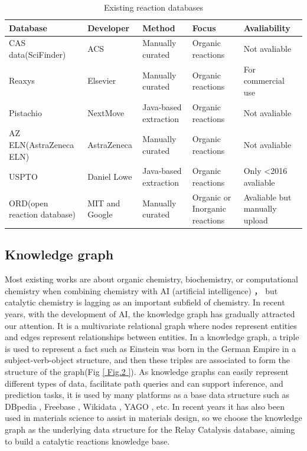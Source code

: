 \documentclass[%
 aip,
 jmp,%
 amsmath,amssymb,
 reprint,%
]{revtex4-2}
\begin{document}
\begin{table}[h!]
\begin{tabular}{ |p{3cm}|p{3cm}|p{3cm}|p{3cm}|p{3cm}|  }
\hline
Database&Developer&Method&Focus&Avaliability\\ \hline
CAS data(SciFinder)& ACS    &Manually curated&   Organic reactions&Not avaliable\\ \hline
Reaxys&   Elsevier  & Manually curated   &Organic reactions&For commercial use\\ \hline
Pistachio & NextMove & Java-based extraction &  Organic reactions&Not avaliable\\ \hline
AZ ELN(AstraZeneca ELN)    &AstraZeneca & Manually curated&  Organic reactions&Not avaliable\\ \hline
USPTO&   Daniel Lowe  & Java-based extraction&Organic reactions&Only <2016 avaliable\\ \hline
ORD(open reaction database) & MIT and Google  & Manually curated   &Organic or Inorganic reactions&Avaliable but manually upload\\ \hline
\end{tabular}
\caption{Existing reaction databases}
\label{table.1}
\end{table}

\subsection{Knowledge graph}
Most existing works are about organic chemistry, biochemistry, or computational chemistry when combining 
chemistry with AI (artificial intelligence) \cite{winston1992artificial}，
but catalytic chemistry is lagging as an important subfield of 
chemistry. In recent years, with the development of AI, the knowledge graph \cite{auer2018towards} has gradually 
attracted our attention. It is a multivariate relational graph where nodes represent entities and 
edges represent relationships between entities. In a knowledge graph, a triple is used to represent a 
fact such as Einstein was born in the German Empire in a subject-verb-object structure, and then 
these triples are associated to form the structure of the graph(Fig \ref{ Fig.2 }).
As knowledge graphs can easily represent different types of data, facilitate path queries and can support inference, 
and prediction tasks, it is used by many platforms as a base data structure such as DBpedia \cite{auer2007dbpedia}, 
Freebase \cite{inproceedings}, Wikidata \cite{vrandevcic2012wikidata}, YAGO \cite{rebele2016yago}, etc. 
In recent years it has also been used in materials science to assist in materials design\cite{cole2020design}, 
so we choose the knowledge graph as the underlying data structure for the Relay Catalysis database, 
aiming to build a catalytic reactions knowledge base.
\end{document}
